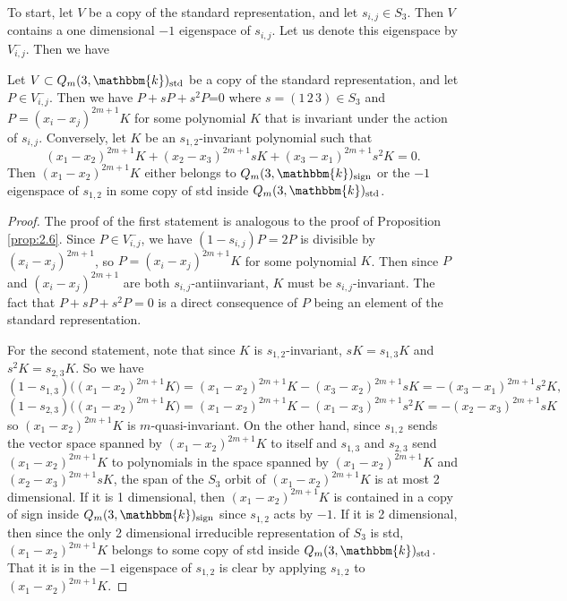 \documentclass[11pt]{article}
\numberwithin{equation}{section}
\theoremstyle{definition}
\numberwithin{equation}{section}
\renewcommand{\k}{\mathbbm{k}}
\newcommand{\sgn}{\mathrm{sign}}
\newcommand{\std}{\mathrm{std}}
\begin{document}
To start, let $V$ be a copy of the standard representation, and let $s_{i,j}\in S_3$. Then $V$ contains a one dimensional $-1$ eigenspace of $s_{i,j}$. Let us denote this eigenspace by $V_{i,j}^-$. Then we have

\begin{lemma}\label{lem:3.2}
    Let $V\subset Q_m(3,\k)_\std$ be a copy of the standard representation, and let $P\in V_{i,j}^-$. Then we have $P+sP+s^2P$=0 where $s=(1\,2\,3)\in S_3$ and $P=(x_i-x_j)^{2m+1}K$ for some polynomial $K$ that is invariant under the action of $s_{i,j}$. Conversely, let $K$ be an $s_{1,2}$-invariant polynomial such that 
    $$(x_1-x_2)^{2m+1}K+(x_2-x_3)^{2m+1}sK+(x_3-x_1)^{2m+1}s^2K=0.$$
    Then $(x_1-x_2)^{2m+1}K$ either belongs to $Q_m(3,\k)_\sgn$ or the $-1$ eigenspace of $s_{1,2}$ in some copy of std inside $Q_m(3,\k)_\std$.
\end{lemma}
\begin{proof}
    The proof of the first statement is analogous to the proof of Proposition \ref{prop:2.6}. Since $P\in V_{i,j}^-$, we have $(1-s_{i,j})P=2P$ is divisible by $(x_i-x_j)^{2m+1}$, so $P=(x_i-x_j)^{2m+1}K$ for some polynomial $K$. Then since $P$ and $(x_i-x_j)^{2m+1}$ are both $s_{i,j}$-antiinvariant, $K$ must be $s_{i,j}$-invariant. The fact that $P+sP+s^2P=0$ is a direct consequence of $P$ being an element of the standard representation.
    
    For the second statement, note that since $K$ is $s_{1,2}$-invariant, $sK=s_{1,3}K$ and $s^2K=s_{2,3}K$. So we have
    $$(1-s_{1,3})\Big((x_1-x_2)^{2m+1}K\Big)=(x_1-x_2)^{2m+1}K-(x_3-x_2)^{2m+1}sK=-(x_3-x_1)^{2m+1}s^2K,$$
    $$(1-s_{2,3})\Big((x_1-x_2)^{2m+1}K\Big)=(x_1-x_2)^{2m+1}K-(x_1-x_3)^{2m+1}s^2K=-(x_2-x_3)^{2m+1}sK$$
    so $(x_1-x_2)^{2m+1}K$ is $m$-quasi-invariant. On the other hand, since $s_{1,2}$ sends the vector space spanned by $(x_1-x_2)^{2m+1}K$ to itself and $s_{1,3}$ and $s_{2,3}$ send $(x_1-x_2)^{2m+1}K$ to polynomials in the space spanned by $(x_1-x_2)^{2m+1}K$ and $(x_2-x_3)^{2m+1}sK$, the span of the $S_3$ orbit of $(x_1-x_2)^{2m+1}K$ is at most 2 dimensional. If it is 1 dimensional, then $(x_1-x_2)^{2m+1}K$ is contained in a copy of sign inside $Q_m(3,\k)_\sgn$ since $s_{1,2}$ acts by $-1$. If it is 2 dimensional, then since the only 2 dimensional irreducible representation of $S_3$ is std, $(x_1-x_2)^{2m+1}K$ belongs to some copy of std inside $Q_m(3,\k)_\std$. That it is in the $-1$ eigenspace of $s_{1,2}$ is clear by applying $s_{1,2}$ to $(x_1-x_2)^{2m+1}K$.
\end{proof}
\end{document}
